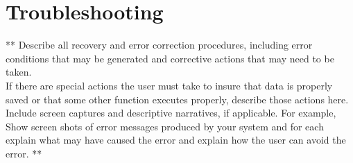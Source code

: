 \documentclass{article}
\begin{document}
\section{Troubleshooting}
** Describe all recovery and error correction procedures, including error conditions that may
be generated and corrective actions that may need to be taken.\\
If there are special actions the user must take to insure that data is properly saved or
that some other function executes properly, describe those actions here. Include screen
captures and descriptive narratives, if applicable. For example, Show screen shots of error
messages produced by your system and for each explain what may have caused the error
and explain how the user can avoid the error. **
\end{document}
